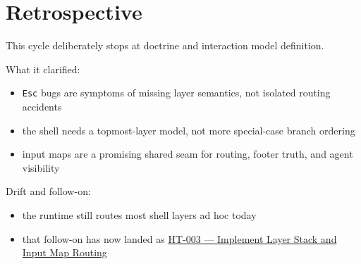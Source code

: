 \section{Retrospective}\label{record-254-retrospective}

This cycle deliberately stops at doctrine and interaction model definition.

What it clarified:

\begin{itemize}
\tightlist
\item
  \texttt{E\allowbreak{}s\allowbreak{}c} bugs are symptoms of missing layer semantics, not isolated routing accidents
\item
  the shell needs a topmost-layer model, not more special-case branch ordering
\item
  input maps are a promising shared seam for routing, footer truth, and agent visibility
\end{itemize}

Drift and follow-on:

\begin{itemize}
\tightlist
\item
  the runtime still routes most shell layers ad hoc today
\item
  that follow-on has now landed as \href{https://github.com/flyingrobots/bijou/blob/cbd70612140e7a450d764b3c7be1c6af878b99bc/docs/design/HT-003-implement-layer-stack-and-input-map-routing.md}{HT-003 --- Implement Layer Stack and Input Map Routing}
\end{itemize}

